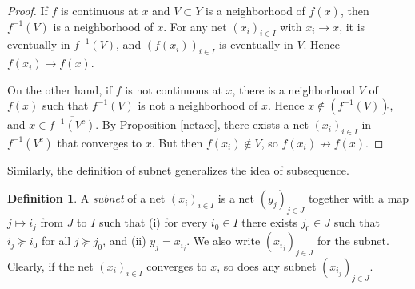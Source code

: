 \documentclass{article}
\numberwithin{equation}{section}
\newcommand{\ol}{\overline}
\theoremstyle{plain}
\theoremstyle{definition}
\newtheorem{definition}[theorem]{Definition}
\begin{document}
\begin{proof}
If $f$ is continuous at $x$ and $V\subset Y$ is a neighborhood of $f(x)$, then $f^{-1}(V)$ is a neighborhood of $x$. For any net $(x_i)_{i\in I}$ with $x_i\to x$, it is eventually in $f^{-1}(V)$, and $(f(x_i))_{i\in I}$ is eventually in $V$. Hence $f(x_i)\to f(x)$.

On the other hand, if $f$ is not continuous at $x$, there is a neighborhood $V$ of $f(x)$ such that $f^{-1}(V)$ is not a neighborhood of $x$. Hence $x\notin (f^{-1}(V))\mathring{}$, and $x\in\ol{f^{-1}(V^c)}$. By Proposition \ref{netacc}, there exists a net $(x_i)_{i\in I}$ in $f^{-1}(V^c)$ that converges to $x$. But then $f(x_i)\notin V$, so $f(x_i)\not\to f(x)$.
\end{proof}

Similarly, the definition of subnet generalizes the idea of subsequence. 
\begin{definition}
A \textit{subnet} of a net $(x_i)_{i\in I}$ is a net $(y_j)_{j\in J}$ together with a map $j\mapsto i_j$ from $J$ to $I$ such that (i) for every $i_0\in I$ there exists $j_0\in J$ such that $i_j\succeq i_0$ for all $j\succeq j_0$, and
(ii) $y_j=x_{i_j}$. We also write $(x_{i_j})_{j\in J}$ for the subnet. Clearly, if the net $(x_i)_{i\in I}$ converges to $x$, so does any subnet $(x_{i_j})_{j\in J}$.
\end{definition} 
\end{document}
